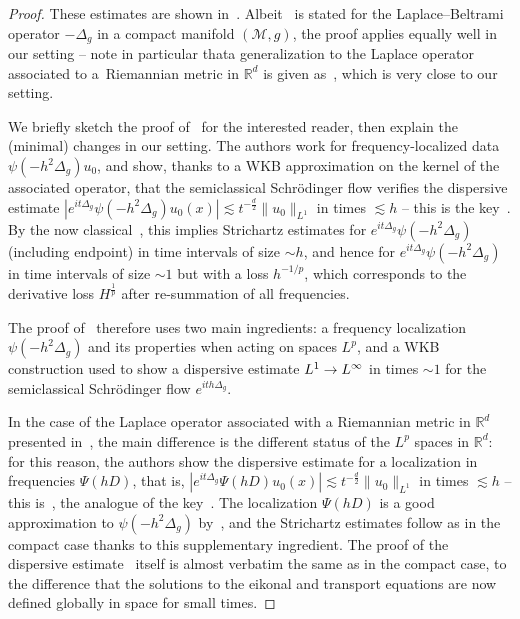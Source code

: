 \documentclass[10pt]{amsart}
\theoremstyle{definition}\newtheorem{defi}[theo]{Definition}\newtheorem{rema}[theo]{Remark}\newtheorem{exam}[theo]{Example}\newtheorem{exem}[theo]{Example}\newtheorem{nota}[theo]{Notation}
\newcommand*\R{\mathbb{R}}
\newcommand{\clM}{\mathcal{M}}
\renewcommand*{\to}{\mathchoice{\longrightarrow}{\rightarrow}{\rightarrow}{\rightarrow}}
\begin{document}
\begin{proof}
These estimates are shown in~\cite[Theorem~1]{BuGeTz04}. Albeit~\cite[Theorem~1]{BuGeTz04} is stated for the Laplace--Beltrami operator $-\Delta_g$ in a compact manifold $(\clM, g)$, the proof applies equally well in our setting -- note in particular that\linebreak a generalization to the Laplace operator associated to a~Riemannian metric in $\R^d$ is given as~\cite[Appendix~A.1]{BuGeTz04}, which is very close to our setting.

We briefly sketch the proof of~\cite[Theorem~1]{BuGeTz04} for the interested reader, then explain the (minimal) changes in our setting. The authors work for frequency-localized data $\psi(-h^2 \Delta_g) u_0$, and show, thanks to a WKB approximation on the kernel of the associated operator, that the semiclassical Schr{\"o}dinger flow verifies the dispersive estimate $|e^{it\Delta_g}\psi(-h^2 \Delta_g) u_0 (x)| \lesssim t^{-\frac d2}\| u_0 \|_{L^1}$ in times $\lesssim h$ -- this is the key~\cite[Lemma~2.5]{BuGeTz04}. By the now classical~\cite{KeTa98}, this implies Strichartz estimates for $e^{it\Delta_g}\psi(-h^2 \Delta_g)$ (including endpoint) in time intervals of size $\sim h$, and hence for $e^{it\Delta_g}\psi(-h^2 \Delta_g)$ in time intervals of size $\sim 1$ but with a loss $h^{-1/p}$, which corresponds to the derivative loss $H^{\frac 1p}$ after re-summation of all frequencies.

The proof of~\cite[Theorem~1]{BuGeTz04} therefore uses two main ingredients: a frequency localization $\psi(-h^2 \Delta_g)$ and its properties when acting on spaces $L^p$, and a WKB construction used to show a dispersive estimate $L^1\to L^\infty$ in times $\sim 1$ for the semiclassical Schr{\"o}dinger flow $e^{ith\Delta_g}$.

In the case of the Laplace operator associated with a Riemannian metric in $\R^d$ presented in~\cite[Appendix~A.1]{BuGeTz04}, the main difference is the different status of the $L^p$ spaces in $\R^d$: for this reason, the authors show the dispersive estimate for a localization in frequencies $\Psi(hD)$, that is, $|e^{it\Delta_g}\Psi(hD) u_0 (x)| \lesssim t^{-\frac d2}\| u_0 \|_{L^1}$ in times $\lesssim h$ -- this is~\cite[Lemma~A.3]{BuGeTz04}, the analogue of the key~\cite[Lemma~2.5]{BuGeTz04}. The localization $\Psi(hD)$ is a good approximation to $\psi(-h^2 \Delta_g)$ by~\cite[Proposition~A.1, Corollary~A.2]{BuGeTz04}, and the Strichartz estimates follow as in the compact case thanks to this supplementary ingredient. The proof of the dispersive estimate~\cite[Lemma~A.3]{BuGeTz04} itself is almost verbatim the same as in the compact case, to the difference that the solutions to the eikonal and transport equations are now defined globally in space for small times.


\end{proof}
\end{document}
